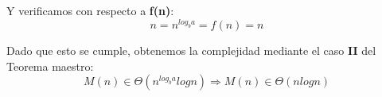     Y verificamos con respecto a \textbf{f(n)}:
    \begin{equation*}
        n = n^{log_ba} = f(n) = n
    \end{equation*}
    
    Dado que esto se cumple, obtenemos la complejidad mediante el caso \textbf{II} del Teorema maestro:
    \begin{equation*}
        M(n) \in \Theta(n^{log_ba}logn) \Rightarrow M(n) \in \Theta(nlogn)
    \end{equation*}
